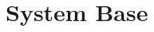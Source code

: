 \documentclass[
	english,
	ruledheaders=section,%
	class=report,%
	thesis={type=Report},%
	accentcolor=9c,%
	custommargins=true,%
	marginpar=false,%
	parskip=half-,%
	fontsize=11pt,%
	logofile={img/tuda_logo.pdf}, %
]{tudapub}
\begin{document}






\chapter{System Base}

\label{chap:SystemBase}



\end{document}
